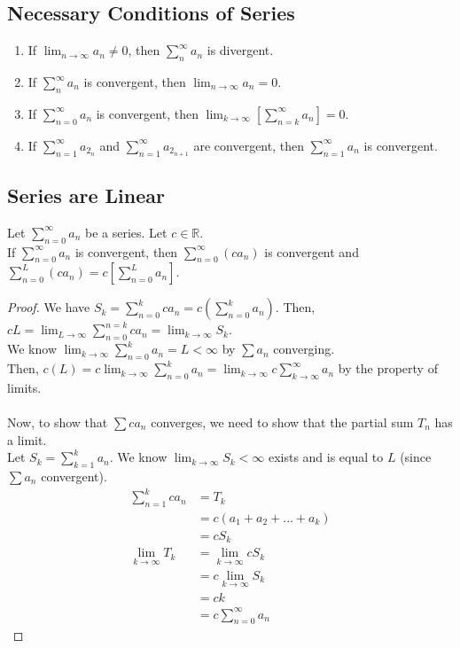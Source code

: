 \documentclass{article}
\begin{document}
\subsection{Necessary Conditions of Series}
\begin{enumerate}
    \item If $\lim_{n\to\infty} a_n \neq 0$, then $\sum_{n}^\infty a_n$ is divergent.
    
    \item If $\sum_{n}^\infty a_n$ is convergent, then $\lim_{n\to\infty}a_n = 0$.
    
    \item If $\sum_{n=0}^\infty a_n$ is convergent, then $\lim_{k\to\infty}\left[\sum_{n=k}^\infty a_n\right] = 0$.
    
    \item If $\sum_{n=1}^\infty a_{2_n}$ and $\sum_{n=1}^\infty a_{2_{n+1}}$ are convergent, then $\sum_{n=1}^\infty a_n$ is convergent.
\end{enumerate}

\subsection{Series are Linear}
Let $\sum_{n=0}^\infty a_n$ be a series. Let $c \in \mathbb{R}$.\\
If $\sum_{n=0}^\infty a_n$ is convergent, then $\sum_{n=0}^\infty (ca_n)$ is convergent and $\sum_{n=0}^L (ca_n) = c\left[ \sum_{n=0}^L a_n \right]$.
\begin{proof}
We have $S_k = \sum_{n=0}^k ca_n = c (\sum_{n=0}^k a_n)$. Then, $cL = \lim_{L\to\infty} \sum_{n=0}^{n=k} ca_n = \lim_{k\to\infty} S_k$.\\
We know $\lim_{k\to\infty} \sum_{n=0}^k a_n = L < \infty$ by $\sum a_n$ converging.\\
Then, $c(L) = c \lim_{k\to\infty} \sum_{n=0}^k a_n = \lim_{k\to\infty} c \sum_{k\to\infty}^\infty a_n$ by the property of limits.\\
\\
Now, to show that $\sum ca_n$ converges, we need to show that the partial sum $T_n$ has a limit.\\
Let $S_k = \sum_{k=1}^k a_n$. We know $\lim_{k\to\infty} S_k < \infty$ exists and is equal to $L$ (since $\sum a_n$ convergent).
\begin{align*}
    \sum_{n=1}^k ca_n & = T_k\\
    & = c(a_1 + a_2 + ... + a_k)\\
    & = c S_k\\
    \lim_{k\to\infty} T_k & = \lim_{k\to\infty} c S_k\\
    & = c\lim_{k\to\infty}S_k\\
    & = c k\\
    & = c\sum_{n=0}^\infty a_n
\end{align*}
\end{proof}
\end{document}
